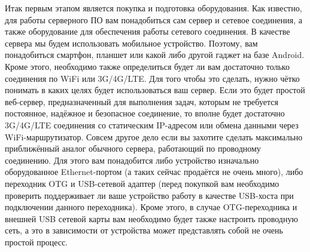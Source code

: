 \documentclass[10pt, a5paper]{article}
\begin{document}
Итак первым этапом является покупка и подготовка оборудования. Как известно, для работы серверного ПО вам понадобиться сам сервер и сетевое соединения, а также оборудование для обеспечения работы сетевого соединения. В качестве сервера мы будем использовать мобильное устройство. Поэтому, вам понадобиться смартфон, планшет или какой либо другой гаджет на базе Android. Кроме этого, необходимо также определиться будет ли вам достаточно только соединения по WiFi или 3G/4G/LTE. Для того чтобы это сделать, нужно чётко понимать в каких целях будет использоваться ваш сервер. Если это будет простой веб-сервер, предназначенный для выполнения задач, которым не требуется постоянное, надёжное и безопасное соединение, то  вполне будет достаточно 3G/4G/LTE соединения со статическим IP-адресом или обмена данными через WiFi-маршрутизатор. Совсем другое дело если вы захотите сделать максимально приближённый аналог обычного сервера, работающий по проводному соединению. Для этого вам понадобится либо устройство изначально оборудованное Ethernet-портом (а таких сейчас продаётся не очень много), либо переходник OTG и USB-сетевой адаптер (перед покупкой вам необходимо проверить поддерживает ли ваше устройство работу в качестве USB-хоста при подключении данного переходника). Кроме этого, в случае OTG-переходника и внешней USB сетевой карты вам необходимо будет также настроить проводную сеть, а это в зависимости от устройства может представлять собой не очень простой процесс.
\end{document}
